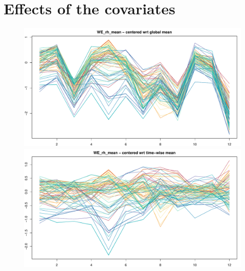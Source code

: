 \documentclass[12pt,	%
	a4paper,		%
	twoside,		%
	openright,		%
	titlepage,%
	]{book}
\theoremstyle{definition}
\begin{document}
\section{Effects of the covariates}

\begin{figure}[!ht]
    \centering
    \includegraphics[width=1\linewidth]{Testing/Covariates/corollary images/WE_rh_meancentered wrt global mean.pdf}
    \includegraphics[width=1\linewidth]{Testing/Covariates/corollary images/WE_rh_meancentered wrt time-wise mean.pdf}

\end{figure}
\end{document}
